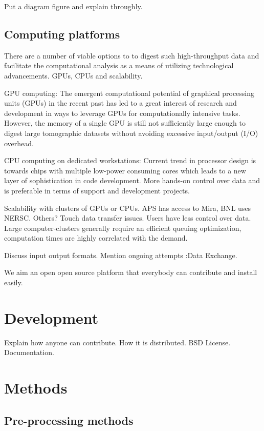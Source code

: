 \documentclass[pdf]{iucr}              %
\begin{document}
Put a diagram figure and explain throughly.

\subsection{Computing platforms}

There are a number of viable options to to digest such high-throughput data and facilitate the computational analysis as a means of utilizing technological advancements. GPUs, CPUs and scalability.

GPU computing: The emergent computational potential of graphical processing units (GPUs) in the recent past has led to a great interest of research and development in ways to leverage GPUs for computationally intensive tasks. However, the memory of a single GPU is still not sufficiently large enough to digest large tomographic datasets without avoiding excessive input/output (I/O) overhead. 

CPU computing on dedicated workstations: Current trend in processor design is towards chips with multiple low-power consuming cores which leads to a new layer of sophistication in code development. More hands-on control over data and is preferable in terms of support and development projects.

Scalability with clusters of GPUs or CPUs. APS has  access to Mira, BNL uses NERSC. Others? Touch data transfer issues. Users have less control over data. Large computer-clusters generally require an efficient queuing optimization, computation times are highly correlated with the demand.  

Discuss input output formats. Mention ongoing attempts :Data Exchange.

We aim an open open source platform that everybody can contribute and install easily.

\section{Development}

Explain how anyone can contribute. How it is distributed. BSD License. Documentation.

\section{Methods} 

\subsection{Pre-processing methods}
\end{document}
